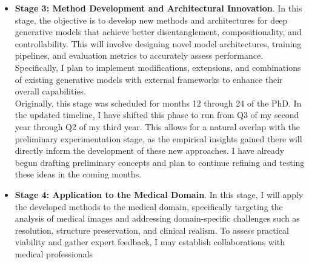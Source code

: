 \begin{itemize}
    key generative models, such as VAEs, Diffusion, and Flow Matching, and implementing various disentanglement and compositionality 
    metrics. \\
    Initially, this stage was scheduled for completion between Q3 and Q4 of my first year. In practice, I began these preliminary experiments 
    slightly later, in Q4. Furthermore, I realized that preliminary experimentation is not a brief phase that can be concluded in a 
    few months. Instead, it heavily overlaps with the literature review, as new methods and architectures are constantly emerging. 
    Consequently, I have extended this stage through Q4 of my second year; I have found that actively implementing and experimenting 
    with these models is an excellent way to deepen my understanding of the literature and identify ongoing challenges. I have already 
    implemented several key models and metrics, and some of these initial results are presented in the experiments section.  
    \item \textbf{Stage 3: Method Development and Architectural Innovation}. In this stage, the objective is to develop new methods and 
    architectures for deep generative models that achieve better disentanglement, compositionality, and controllability. This will involve 
    designing novel model architectures, training pipelines, and evaluation metrics to accurately assess performance. Specifically, I 
    plan to implement modifications, extensions, and combinations of existing generative models with external frameworks to enhance their 
    overall capabilities. \\
    Originally, this stage was scheduled for months 12 through 24 of the PhD. In the updated timeline, I have shifted this phase to run 
    from Q3 of my second year through Q2 of my third year. This allows for a natural overlap with the preliminary experimentation stage, 
    as the empirical insights gained there will directly inform the development of these new approaches. I have already begun drafting 
    preliminary concepts and plan to continue refining and testing these ideas in the coming months.
    \item \textbf{Stage 4: Application to the Medical Domain}. In this stage, I will apply the developed methods to the medical domain, 
    specifically targeting the analysis of medical images and addressing domain-specific challenges such as resolution, structure preservation, 
    and clinical realism. To assess practical viability and gather expert feedback, I may establish collaborations with medical professionals 

\end{itemize}
